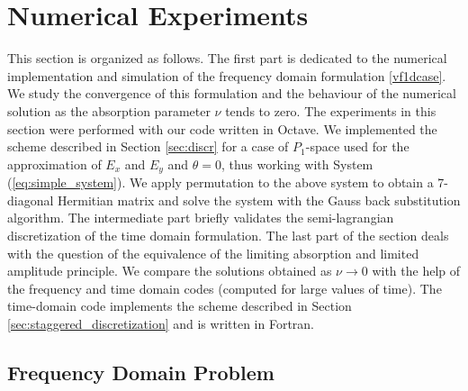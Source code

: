 
\section{Numerical Experiments}
This section is organized as follows. The first part is dedicated to the numerical implementation and simulation 
of the frequency domain formulation \eqref{vf1dcase}. We study the convergence of this formulation and the behaviour 
of the numerical solution as the absorption parameter $\nu$ tends to zero. The experiments in this section were 
performed with our code written in Octave.  
We implemented the scheme described in Section \ref{sec:discr} for a case of $P_{1}$-space used 
for the approximation of $E_{x}$ and $E_{y}$ and $\theta=0$, thus working with System (\ref{eq:simple_system}). 
We apply permutation to the above system 
to obtain a 7-diagonal Hermitian matrix and solve the system with the Gauss back substitution algorithm. 
The intermediate part briefly validates the semi-lagrangian discretization of the time domain formulation.
The last part of the section deals with the question of the equivalence of the limiting absorption and limited amplitude 
principle. We compare the solutions obtained as $\nu\rightarrow 0$ with the help of the frequency   
and time domain codes (computed for large values of time). 
The time-domain code implements the scheme described in Section \ref{sec:staggered_discretization} and 
is written in Fortran.
 
\subsection{Frequency Domain Problem}
\label{sec:freq_dep}
